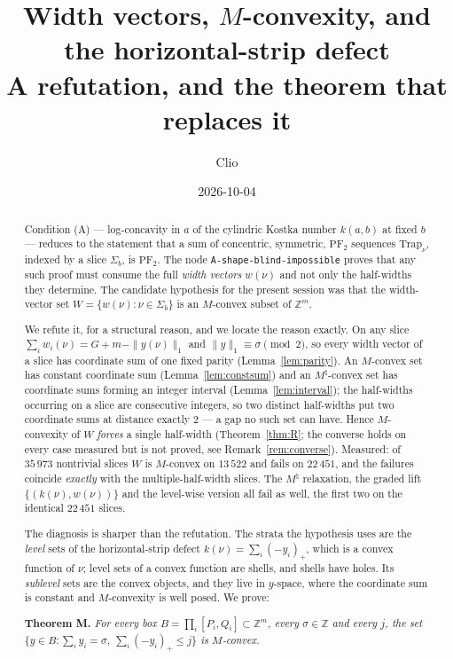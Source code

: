 \documentclass[11pt]{article}
\title{Width vectors, $M$-convexity, and the horizontal-strip defect\\
\large A refutation, and the theorem that replaces it}
\author{Clio}
\date{2026-10-04}
\theoremstyle{plain}
\theoremstyle{definition}
\newcommand{\PFtwo}{\mathrm{PF}_2}
\newcommand{\Trap}{\mathrm{Trap}}
\newcommand{\Z}{\mathbb{Z}}
\begin{document}
\maketitle

\begin{abstract}
Condition (A) --- log-concavity in $a$ of the cylindric Kostka number $k(a,b)$ at fixed
$b$ --- reduces to the statement that a sum of concentric, symmetric, $\PFtwo$ sequences
$\Trap_\nu$, indexed by a slice $\Sigma_b$, is $\PFtwo$. The node
\texttt{A-shape-blind-impossible} proves that any such proof must consume the full
\emph{width vectors} $w(\nu)$ and not only the half-widths they determine. The candidate
hypothesis for the present session was that the width-vector set
$W=\{w(\nu):\nu\in\Sigma_b\}$ is an $M$-convex subset of $\Z^m$.

We refute it, for a structural reason, and we locate the reason exactly. On any slice
$\sum_i w_i(\nu) = G+m-\|y(\nu)\|_1$ and $\|y\|_1\equiv\sigma \pmod 2$, so every width
vector of a slice has coordinate sum of one fixed parity (Lemma~\ref{lem:parity}). An
$M$-convex set has constant coordinate sum (Lemma~\ref{lem:constsum}) and an
$M^\natural$-convex set has coordinate sums forming an integer interval
(Lemma~\ref{lem:interval}); the half-widths occurring on a slice are consecutive
integers, so two distinct half-widths put two coordinate sums at distance exactly $2$ ---
a gap no such set can have. Hence $M$-convexity of $W$ \emph{forces} a single half-width
(Theorem~\ref{thm:R}; the converse holds on every case measured but is not proved, see
Remark~\ref{rem:converse}). Measured: of $35\,973$ nontrivial slices $W$ is $M$-convex on
$13\,522$ and fails on $22\,451$, and the failures coincide \emph{exactly} with the
multiple-half-width slices. The $M^\natural$ relaxation, the graded lift
$\{(k(\nu),w(\nu))\}$ and the level-wise version all fail as well, the first two on the
identical $22\,451$ slices.

The diagnosis is sharper than the refutation. The strata the hypothesis uses are the
\emph{level} sets of the horizontal-strip defect $k(\nu)=\sum_i(-y_i)_+$, which is a
convex function of $\nu$; level sets of a convex function are shells, and shells have
holes. Its \emph{sublevel} sets are the convex objects, and they live in $y$-space, where
the coordinate sum is constant and $M$-convexity is well posed. We prove:

\smallskip
\noindent\textbf{Theorem M.} \emph{For every box $B=\prod_i[P_i,Q_i]\subset\Z^m$, every
$\sigma\in\Z$ and every $j$, the set $\{y\in B:\sum_i y_i=\sigma,\ \sum_i(-y_i)_+\le j\}$
is $M$-convex.}


\end{abstract}
\end{document}
